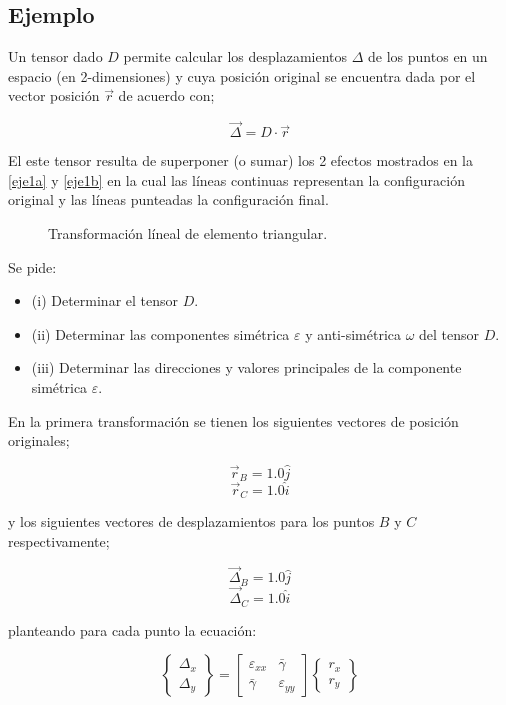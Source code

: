 \documentclass[../notas medios.tex]{subfiles}
\begin{document}
\subsection*{Ejemplo}
Un tensor dado $D$ permite calcular los desplazamientos $\Delta$   de los puntos en un espacio (en 2-dimensiones) y cuya posición original se encuentra dada por el vector posición ${\vec r}$   de acuerdo con;

\[\vec \Delta  = D \cdot \vec r\]

El este tensor resulta de superponer (o sumar) los 2 efectos mostrados en la \cref{eje1a} y \cref{eje1b} en la cual las líneas continuas representan la configuración original y las líneas punteadas la configuración final.

\begin{figure}[H]
     \centering
     \hspace{0.5cm}
     \caption{Transformación líneal de elemento triangular.}
     \label{steady_state1}
\end{figure}

Se pide:

\begin{itemize}
\item (i) Determinar el tensor $D$.
\item (ii) Determinar las componentes simétrica $\varepsilon$ y anti-simétrica $\omega$ del tensor $D$.
\item (iii) Determinar las direcciones y valores principales de la componente simétrica $\varepsilon$.
\end{itemize}

En la primera transformación se tienen los siguientes vectores de posición originales;

\[{\vec r_B} = 1.0\hat j\]
\[{\vec r_C} = 1.0\hat i\]

y los siguientes vectores de desplazamientos para los puntos $B$ y $C$ respectivamente;

\[{\vec \Delta _B} = 1.0\hat j\]
\[{\vec \Delta _C} = 1.0\hat i\]

planteando para cada punto la ecuación:

\[\left\{ {\begin{array}{*{20}{c}}
{{\Delta _x}}\\
{{\Delta _y}}
\end{array}} \right\} = \left[ {\begin{array}{*{20}{c}}
{{\varepsilon _{xx}}}&\bar{\gamma} \\
\bar{\gamma} &{{\varepsilon _{yy}}}
\end{array}} \right]\left\{ {\begin{array}{*{20}{c}}
{{r_x}}\\
{{r_y}}
\end{array}} \right\}\]
\end{document}
